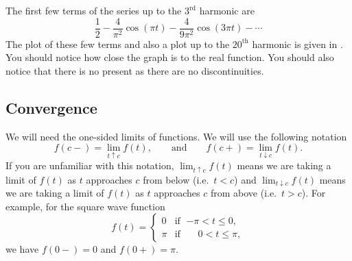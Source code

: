 \begin{example}
The first few terms of the series
up to the $3^{\text{rd}}$ harmonic are
\begin{equation*}
\frac{1}{2} -
\frac{4}{\pi^2} \cos (\pi t)
-
\frac{4}{9 \pi^2} \cos (3 \pi t)
- \cdots
\end{equation*}
The plot of these few terms and also a plot up to the ${20}^{\text{th}}$
harmonic is given in
.  You should notice how close the graph is
to the real function.  You should also notice that there is no
 present as there are no discontinuities.

\begin{myfig}
\capstart
\caption{Fourier series of $f(t)$ up to the $3^{\text{rd}}$ harmonic (left
graph)
and up to the ${20}^{\text{th}}$ harmonic (right graph).\label{gfs:sawcontfsfig}}
\end{myfig}
\end{example}

\subsection{Convergence}

We will need the one-sided limits of functions.
We will use the following notation
\begin{equation*}
f(c-) = \lim_{t \uparrow c} f(t),
\qquad \text{and} \qquad
f(c+) = \lim_{t \downarrow c} f(t).
\end{equation*}
If you are unfamiliar with this notation,
$\lim_{t \uparrow c} f(t)$ means we are taking a limit of $f(t)$
as $t$ approaches $c$ from below (i.e.\ $t < c$) and
$\lim_{t \downarrow c} f(t)$ means we are taking a limit of $f(t)$
as $t$ approaches $c$ from above (i.e.\ $t > c$).
For example, for the square wave function
\begin{equation} \label{gfs:sqwaveeq}
f(t) =
\begin{cases}
0 & \text{if } \; {-\pi} < t \leq 0 , \\
\pi & \text{if } \; \phantom{-}0 < t \leq \pi ,
\end{cases}
\end{equation}
we have $f(0-) = 0$ and $f(0+) = \pi$.

